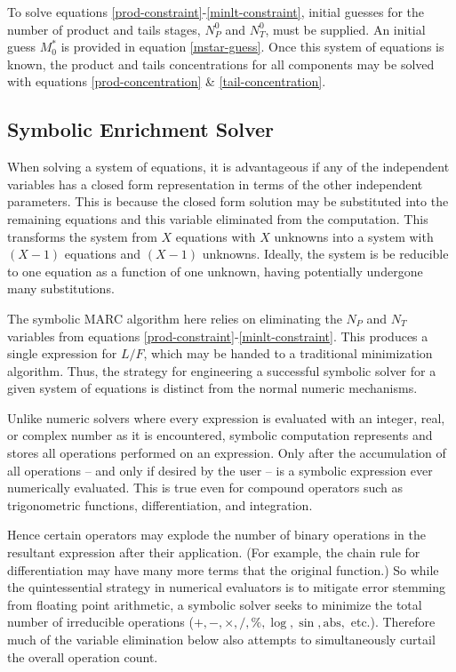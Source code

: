 \documentclass[preprint,12pt]{elsarticle}
\begin{document}
To solve equations \ref{prod-constraint}-\ref{minlt-constraint}, initial guesses
for the number of product and tails stages, $N_P^0$ and $N_T^0$, must be supplied.
An initial guess $M_0^*$ is provided in equation \ref{mstar-guess}.  Once this 
system of equations is known, the product and tails concentrations for all 
components may be solved with equations \ref{prod-concentration} \& 
\ref{tail-concentration}.

\subsection{Symbolic Enrichment Solver}
\label{sec:symes}

When solving a system of equations, it is advantageous if any of the independent 
variables has a closed form representation in terms of the other independent 
parameters. This is because the closed form solution may be substituted into 
the remaining equations and this variable eliminated from the computation.  This
transforms the system from $X$ equations with $X$ unknowns into a system with 
$(X-1)$ equations and $(X-1)$  unknowns.  Ideally, the system is be reducible 
to one equation as a function of one unknown, having potentially undergone many 
substitutions.

The symbolic MARC algorithm here relies on eliminating the $N_P$ and $N_T$ variables
from equations \ref{prod-constraint}-\ref{minlt-constraint}. This produces a single
expression for $L/F$, which may be handed to a traditional minimization algorithm.
Thus, the strategy for engineering a successful symbolic solver for a given system
of equations is distinct from the normal numeric mechanisms.

Unlike numeric solvers where every expression is evaluated with an integer, real, or
complex number as it is encountered, symbolic computation represents and stores all 
operations performed on an expression.  Only after the accumulation of all 
operations -- and only if desired by the user -- is a symbolic expression ever numerically
evaluated.  This is true even for compound operators such as trigonometric functions, 
differentiation, and integration.

Hence certain operators may explode the number of binary
operations in the resultant expression after their application. 
(For example, the chain rule for differentiation may have many more terms that 
the original function.)
So while the quintessential strategy in numerical evaluators is to mitigate error
stemming from floating point arithmetic, a symbolic solver seeks to minimize the total
number of irreducible operations ($+, -, \times, /, \%, \log, \sin, \mbox{abs},$ etc.). 
Therefore much of the variable
elimination below also attempts to simultaneously curtail the overall operation count. 
\end{document}
